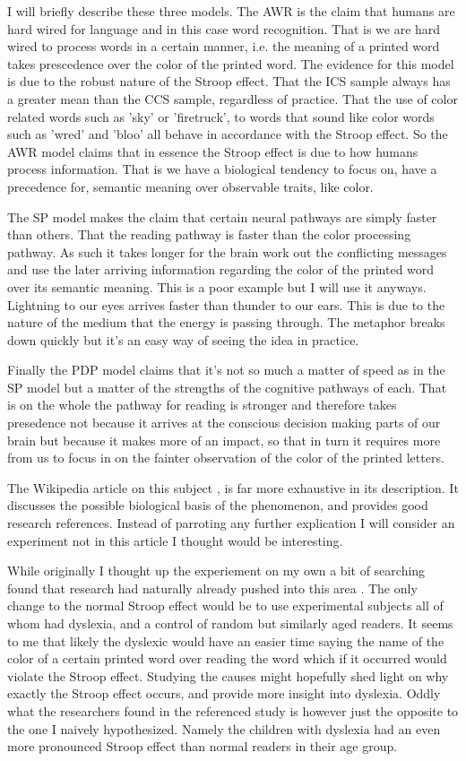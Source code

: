 \documentclass{article}
\begin{document}
I will briefly describe these three models.  The AWR is the claim that humans
are hard wired for language and in this case word recognition.  That is we are
hard wired to process words in a certain manner, i.e. the meaning of a printed
word takes prescedence over the color of the printed word.  The evidence for
this model is due to the robust nature of the Stroop effect.  That the ICS
sample always has a greater mean than the CCS sample, regardless of practice.
That the use of color related words such as 'sky' or 'firetruck', to words that
sound like color words such as 'wred' and 'bloo' all behave in accordance with
the Stroop effect.  So the AWR model claims that in essence the Stroop effect is
due to how humans process information.  That is we have a biological tendency to
focus on, have a precedence for, semantic meaning over observable traits, like
color.

The SP model makes the claim that certain neural pathways are simply faster than
others.  That the reading pathway is faster than the color processing pathway.
As such it takes longer for the brain work out the conflicting messages and use
the later arriving information regarding the color of the printed word over its
semantic meaning.  This is a poor example but I will use it anyways.  Lightning
to our eyes arrives faster than thunder to our ears.  This is due to the nature
of the medium that the energy is passing through.  The metaphor breaks down
quickly but it's an easy way of seeing the idea in practice.

Finally the PDP model claims that it's not so much a matter of speed as in the
SP model but a matter of the strengths of the cognitive pathways of each.  That
is on the whole the pathway for reading is stronger and therefore takes
presedence not because it arrives at the conscious decision making parts of our
brain but because it makes more of an impact, so that in turn it requires more
from us to focus in on the fainter observation of the color of the printed
letters.

The Wikipedia article on this subject \cite{Stroop-wikipedia}, is far more
exhaustive in its description.  It discusses the possible biological basis of
the phenomenon, and provides good research references.  Instead of parroting any
further explication I will consider an experiment not in this article I thought
would be interesting.

While originally I thought up the experiement on my own a bit of searching found
that research had naturally already pushed into this area
\cite{Stroop-dyslexia}.  The only change to the normal Stroop effect would be to
use experimental subjects all of whom had dyslexia, and a control of random but
similarly aged readers.  It seems to me that likely the dyslexic would have an
easier time saying the name of the color of a certain printed word over reading
the word which if it occurred would violate the Stroop effect.  Studying the
causes might hopefully shed light on why exactly the Stroop effect occurs, and
provide more insight into dyslexia.  Oddly what the researchers found in the
referenced study is however just the opposite to the one I naively 
hypothesized.  Namely the children with dyslexia had an even more pronounced
Stroop effect than normal readers in their age group.  
\end{document}
